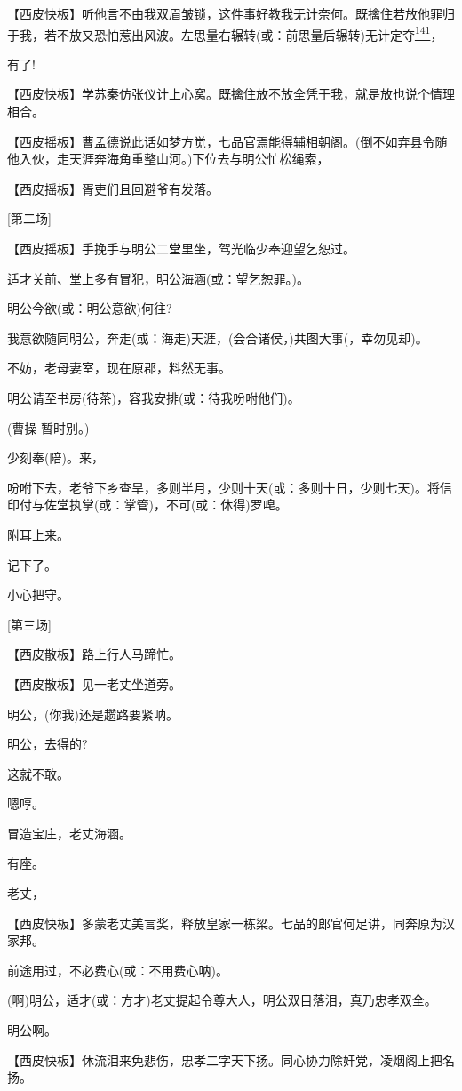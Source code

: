 【西皮快板】听他言不由我双眉皱锁，这件事好教我无计奈何。既擒住若放他罪归于我，若不放又恐怕惹出风波。左思量右辗转(或：前思量后辗转)无计定夺\protect\hyperlink{fn141}{\textsuperscript{141}}，

有了!

【西皮快板】学苏秦仿张仪计上心窝。既擒住放不放全凭于我，就是放也说个情理相合。

【西皮摇板】曹孟德说此话如梦方觉，七品官焉能得辅相朝阁。(倒不如弃县令随他入伙，走天涯奔海角重整山河。)下位去与明公忙松绳索，

【西皮摇板】胥吏们且回避爷有发落。

{[}第二场{]}

【西皮摇板】手挽手与明公二堂里坐，驾光临少奉迎望乞恕过。

适才关前、堂上多有冒犯，明公海涵(或：望乞恕罪。)。

明公今欲(或：明公意欲)何往?

我意欲随同明公，奔走(或：海走)天涯，(会合诸侯，)共图大事(，幸勿见却)。

不妨，老母妻室，现在原郡，料然无事。

明公请至书房(待茶)，容我安排(或：待我吩咐他们)。

(曹操 暂时别。)

少刻奉(陪)。来，

吩咐下去，老爷下乡查旱，多则半月，少则十天(或：多则十日，少则七天)。将信印付与佐堂执掌(或：掌管)，不可(或：休得)罗唣。

附耳上来。

记下了。

小心把守。

{[}第三场{]}

【西皮散板】路上行人马蹄忙。

【西皮散板】见一老丈坐道旁。

明公，(你我)还是趱路要紧呐。

明公，去得的?

这就不敢。

嗯哼。

冒造宝庄，老丈海涵。

有座。

老丈，

【西皮快板】多蒙老丈美言奖，释放皇家一栋梁。七品的郎官何足讲，同奔原为汉家邦。

前途用过，不必费心(或：不用费心呐)。

(啊)明公，适才(或：方才)老丈提起令尊大人，明公双目落泪，真乃忠孝双全。

明公啊。

【西皮快板】休流泪来免悲伤，忠孝二字天下扬。同心协力除奸党，凌烟阁上把名扬。

